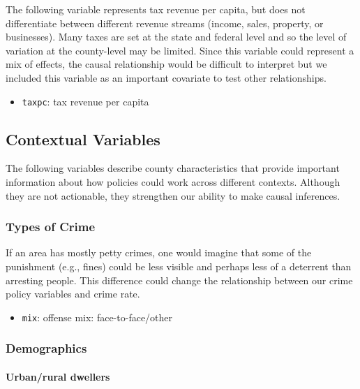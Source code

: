 \documentclass[]{article}
\providecommand{\tightlist}{%
  \setlength{\itemsep}{0pt}\setlength{\parskip}{0pt}}
\let\oldparagraph\paragraph
\renewcommand{\paragraph}[1]{\oldparagraph{#1}\mbox{}}
\begin{document}
The following variable represents tax revenue per capita, but does not
differentiate between different revenue streams (income, sales,
property, or businesses). Many taxes are set at the state and federal
level and so the level of variation at the county-level may be limited.
Since this variable could represent a mix of effects, the causal
relationship would be difficult to interpret but we included this
variable as an important covariate to test other relationships.

\begin{itemize}
\tightlist
\item
  \texttt{taxpc}: tax revenue per capita
\end{itemize}

\hypertarget{contextual-variables}{%
\subsection{Contextual Variables}\label{contextual-variables}}

The following variables describe county characteristics that provide
important information about how policies could work across different
contexts. Although they are not actionable, they strengthen our ability
to make causal inferences.

\hypertarget{types-of-crime}{%
\subsubsection{Types of Crime}\label{types-of-crime}}

If an area has mostly petty crimes, one would imagine that some of the
punishment (e.g., fines) could be less visible and perhaps less of a
deterrent than arresting people. This difference could change the
relationship between our crime policy variables and crime rate.

\begin{itemize}
\tightlist
\item
  \texttt{mix}: offense mix: face-to-face/other
\end{itemize}

\hypertarget{demographics}{%
\subsubsection{Demographics}\label{demographics}}

\hypertarget{urbanrural-dwellers}{%
\paragraph{Urban/rural dwellers}\label{urbanrural-dwellers}}
\end{document}
